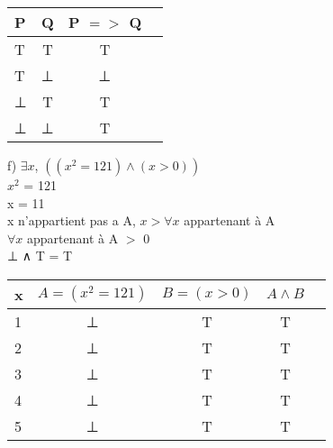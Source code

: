 \begin{tabular}{|l|c|c|c|}
  \hline
  P & Q & P $=>$ Q \\
  \hline
  T & T & T \\
  T & ⊥ & ⊥ \\
  ⊥ & T & T \\
  ⊥ & ⊥ & T \\
  \hline
\end{tabular}

\vspace{10mm}

f) $∃x$, $((x^{2} = 121) ∧ (x > 0))$ \\

$x^{2}$ = 121 \\
x = 11 \\

x n'appartient pas a A, $x> ∀x$ appartenant à A \\

$∀x$ appartenant à A $>$ 0 \\

 ⊥ ∧ T = T \\

\begin{tabular}{|l|c|c|c|c|}
  \hline
  x & $A=(x^{2} = 121)$ & $B=(x > 0)$ & $A ∧ B$ \\
  \hline
  1 & ⊥ & T & T \\
  \hline
  2 & ⊥ & T & T \\
  \hline
  3 & ⊥ & T & T \\
  \hline
  4 & ⊥ & T & T \\
  \hline
  5 & ⊥ & T & T \\
  \hline
\end{tabular}

\vspace{4mm}
